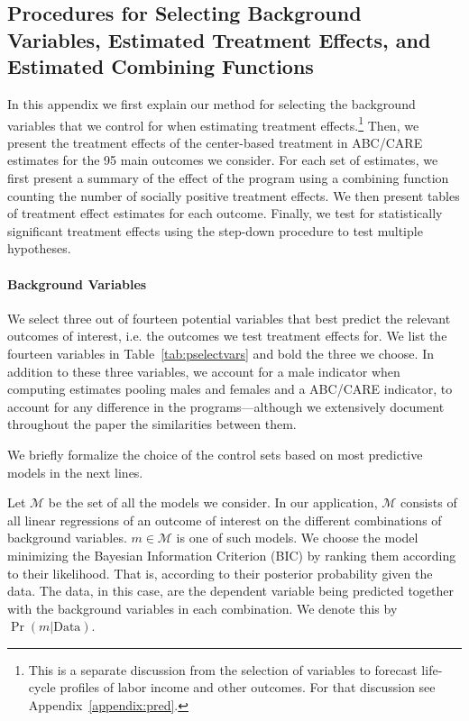 \subsection{Procedures for Selecting Background Variables, Estimated Treatment Effects, and Estimated Combining Functions} \label{appendix:results}

\noindent In this appendix we first explain our method for selecting the background variables that we control for when estimating treatment effects.\footnote{This is a separate discussion from the selection of variables to forecast life-cycle profiles of labor income and other outcomes. For that discussion see Appendix~\ref{appendix:pred}.} Then, we present the treatment effects of the center-based treatment in ABC/CARE estimates for the 95 main outcomes we consider. For each set of estimates, we first present a summary of the effect of the program using a combining function counting the number of socially positive treatment effects. We then present tables of treatment effect estimates for each outcome. Finally, we test for statistically significant treatment effects using the step-down procedure to test multiple hypotheses.

\paragraph{Background Variables} \label{appendix:bvariables}

\noindent We select three out of fourteen potential variables that best predict the relevant outcomes of interest, i.e. the outcomes we test treatment effects for. We list the fourteen variables in Table~\ref{tab:pselectvars} and bold the three we choose. In addition to these three variables, we account for a male indicator when computing estimates pooling males and females and a ABC/CARE indicator, to account for any difference in the programs---although we extensively document throughout the paper the similarities between them.

\singlespacing

\doublespacing

\noindent We briefly formalize the choice of the control sets based on most predictive models in the next lines.

\noindent Let $\mathcal{M}$ be the set of all the models we consider. In our application, $\mathcal{M}$ consists of all linear regressions of an outcome of interest on the different combinations of background variables. $m \in \mathcal{M}$ is one of such models. We choose the model minimizing the Bayesian Information Criterion (BIC) by ranking them according to their likelihood. That is, according to their posterior probability given the data. The data, in this case, are the dependent variable being predicted together with the background variables in each combination. We denote this by $\Pr( m | \text{Data} )$.

